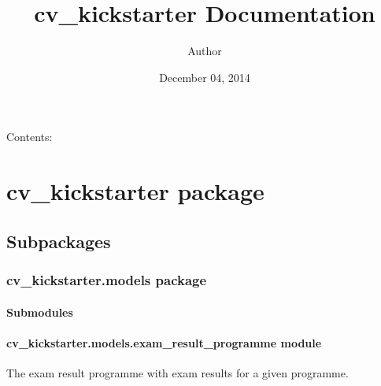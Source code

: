 \documentclass[letterpaper,10pt,english]{sphinxmanual}
\title{cv\_kickstarter Documentation}
\date{December 04, 2014}
\author{Author}
\begin{document}
\maketitle
\tableofcontents
{}\label{index::doc}


Contents:


\chapter{cv\_kickstarter package}
\label{cv_kickstarter:welcome-to-cv-kickstarter-s-documentation}\label{cv_kickstarter:cv-kickstarter-package}\label{cv_kickstarter::doc}

\section{Subpackages}
\label{cv_kickstarter:subpackages}

\subsection{cv\_kickstarter.models package}
\label{cv_kickstarter.models:cv-kickstarter-models-package}\label{cv_kickstarter.models::doc}

\subsubsection{Submodules}
\label{cv_kickstarter.models:submodules}

\subsubsection{cv\_kickstarter.models.exam\_result\_programme module}
\label{cv_kickstarter.models:module-cv_kickstarter.models.exam_result_programme}\label{cv_kickstarter.models:cv-kickstarter-models-exam-result-programme-module}
The exam result programme with exam results for a given programme.
\end{document}
